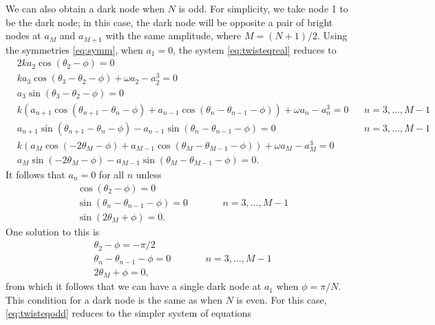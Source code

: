 \documentclass[12pt,reqno]{amsart}
\begin{document}
We can also obtain a dark node when $N$ is odd. For simplicity, we take node 1 to be the dark node; in this case, the dark node will be opposite a pair of bright nodes at $a_M$ and $a_{M+1}$ with the same amplitude, where $M = (N+1)/2$. Using the symmetries \cref{eq:symm}, when $a_1 = 0$, the system \cref{eq:twisteqreal} reduces to 
\begin{equation}\label{eq:twisteqodd}
\begin{aligned}
&2 k a_2 \cos(\theta_2 - \phi) = 0 \\
&k a_3 \cos(\theta_3-\theta_2-\phi) + \omega a_2 - a_2^3 = 0 \\
&a_3 \sin(\theta_3-\theta_2-\phi) = 0 \\
&k\left( a_{n+1} \cos(\theta_{n+1}-\theta_n-\phi) + a_{n-1} \cos(\theta_n - \theta_{n-1}-\phi)\right) + \omega a_n - a_n^3 = 0 && n = 3, \dots, M-1 \\
&a_{n+1} \sin(\theta_{n+1}-\theta_n-\phi) - a_{n-1} \sin(\theta_n - \theta_{n-1}-\phi) = 0 && n = 3, \dots, M-1 \\
&k ( a_M \cos(-2 \theta_M - \phi) + a_{M-1} \cos(\theta_M - \theta_{M-1} - \phi)) + \omega a_M - a_M^3 = 0 \\
& a_M \sin(-2 \theta_M - \phi) - a_{M-1} \sin(\theta_M - \theta_{M-1} - \phi) = 0.
\end{aligned}
\end{equation}
It follows that $a_n = 0$ for all $n$ unless
\begin{equation}\label{eq:odddarknodecond}
\begin{aligned}
&\cos(\theta_2 - \phi) = 0 \\
&\sin(\theta_{n} - \theta_{n-1} - \phi) = 0 && \qquad n = 3, \dots, M-1 \\
&\sin(2 \theta_M + \phi) = 0.
\end{aligned}
\end{equation}
One solution to this is
\begin{equation}\label{eq:odddarknodecond1}
\begin{aligned}
&\theta_2 - \phi = -\pi/2 \\
&\theta_{n} - \theta_{n-1} - \phi = 0 && \qquad n = 3, \dots, M-1 \\
&2 \theta_M + \phi = 0,
\end{aligned}
\end{equation}
from which it follows that we can have a single dark node at $a_1$ when $\phi = \pi/N$. This condition for a dark node is the same as when $N$ is even. For this case, \cref{eq:twisteqodd} reduces to the simpler system of equations
\end{document}
